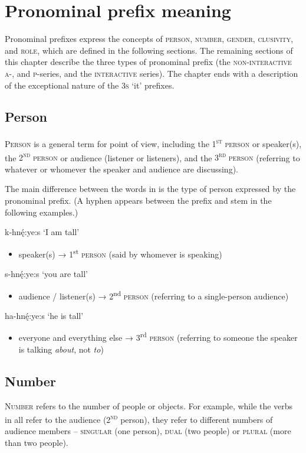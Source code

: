 \chapter{Pronominal prefix meaning} \label{Pronominal prefix meaning}
Pronominal prefixes express the concepts of \textsc{person}, \textsc{number}, \textsc{gender}, \textsc{clusivity}, and \textsc{role}, which are defined in the following sections. The remaining sections of this chapter describe the three types of pronominal prefix (the \textsc{non-interactive} \textsc{a}-, and \textsc{p}-series, and the \textsc{interactive} series). The chapter ends with a description of the exceptional nature of the \textsc{3s} ‘it’ prefixes.


\section{Person} \label{Person}
\textsc{Person} is a general term for point of view, including the \textsc{1\textsuperscript{st} person} or speaker(s), the \textsc{2\textsuperscript{nd} person} or audience (listener or listeners), and the \textsc{3\textsuperscript{rd} person} (referring to whatever or whomever the speaker and audience are discussing). 

The main difference between the words in  is the type of person expressed by the pronominal prefix. (A hyphen appears between the prefix and stem in the following examples.)

\ea\label{ex:perseg100} 
\ea k-hnę́:ye:s ‘I am tall’
\begin{itemize}
    \item  speaker(s) → 1\textsuperscript{st} \textsc{person}  (said by whomever is speaking)
\end{itemize}
\ex s-hnę́:ye:s ‘you are tall’
\begin{itemize}
    \item  audience / listener(s) → 2\textsuperscript{nd} \textsc{person} (referring to a single-person audience)
\end{itemize}
\ex ha-hnę́:ye:s ‘he is tall’
\begin{itemize}
    \item  everyone and everything else → 3\textsuperscript{rd} \textsc{person} (referring to someone the speaker is talking \emph{about}, not \emph{to})
\end{itemize}
\z
\z


\section{Number} \label{Number}
\textsc{Number} refers to the number of people or objects. For example, while the verbs in  all refer to the audience (\textsc{2\textsuperscript{nd}} person), they refer to different numbers of audience members -- \textsc{singular} (one person), \textsc{dual} (two people) or \textsc{plural} (more than two people). 

